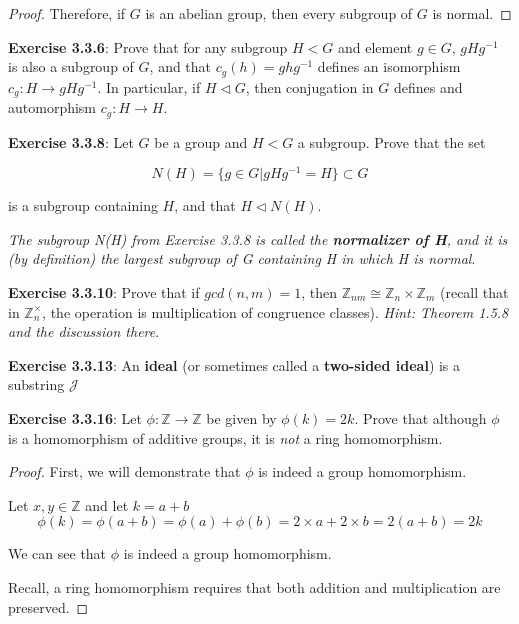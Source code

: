 \documentclass[a4paper]{article}
\begin{document}
\begin{myparindent}{0pt}
\begin{proof}
Therefore, if $G$ is an abelian group, then every subgroup of $G$ is normal.
\end{proof}

\textbf{Exercise 3.3.6}:
Prove that for any subgroup $H < G$ and element $g \in G$, $gHg^{-1}$ is also
a subgroup of $G$, and that $c_g(h) = ghg^{-1}$ defines an isomorphism
$c_g: H \rightarrow gHg^{-1}$. In particular, if $H \triangleleft G$, then
conjugation in $G$ defines and automorphism $c_g: H \rightarrow H$.
\newline

\textbf{Exercise 3.3.8}:
Let $G$ be a group and $H < G$ a subgroup. Prove that the set

\[ N(H) = \{g \in G | gHg^{-1} = H \} \subset G \]
\newline

is a subgroup containing $H$, and that $H \triangleleft N(H)$.

\textit{The subgroup N(H) from Exercise 3.3.8 is called the
\textbf{normalizer of H}, and it is (by definition) the largest subgroup of G
containing H in which H is normal}.
\newline

\textbf{Exercise 3.3.10}:
Prove that if $gcd(n, m) = 1$, then
$\mathbb{Z}_{nm} \cong \mathbb{Z}_n \times \mathbb{Z}_m$
(recall that in $\mathbb{Z}_n^\times$, the operation is multiplication of
congruence classes). \textit{Hint: Theorem 1.5.8 and the discussion there}.
\newline

\textbf{Exercise 3.3.13}:
An \textbf{ideal} (or sometimes called a \textbf{two-sided ideal}) is a
substring $\mathcal{J}$
\newline

\textbf{Exercise 3.3.16}:
Let $\phi: \mathbb{Z} \rightarrow \mathbb{Z}$ be given by $\phi(k) = 2k$. Prove
that although $\phi$ is a homomorphism of additive groups, it is \textit{not}
a ring homomorphism.

\begin{proof}
  First, we will demonstrate that $\phi$ is indeed a group homomorphism. \newline

  Let $x, y \in \mathbb{Z}$ and let $k = a + b$
  \[ \phi(k) = \phi(a + b) = \phi(a) + \phi(b) = 2 \times a + 2 \times b =
  2(a + b) = 2k
  \]

  We can see that $\phi$ is indeed a group homomorphism. \newline

  Recall, a ring homomorphism requires that both addition and multiplication
  are preserved. \newline


\end{proof}
\end{myparindent}
\end{document}

